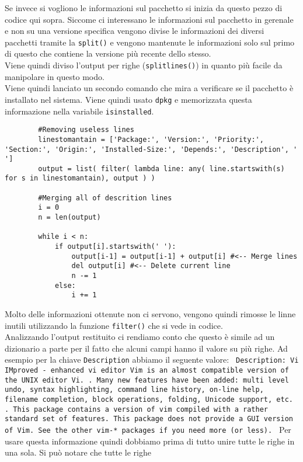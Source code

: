 \documentclass[11pt]{article}
\begin{document}
Se invece si vogliono le informazioni sul pacchetto si inizia da questo pezzo di codice qui sopra. Siccome ci interessano
le informazioni sul pacchetto in gerenale e non su una versione specifica vengono divise le informazioni dei diversi pacchetti
tramite la \texttt{split()} e vengono mantenute le informazioni solo sul primo di questo che contiene la versione
più recente dello stesso.\\
Viene quindi diviso l'output per righe (\texttt{splitlines()}) in quanto più facile da manipolare in questo modo.\\
Viene quindi lanciato un secondo comando che mira a verificare se il pacchetto è installato nel sistema. Viene quindi
usato \texttt{dpkg} e memorizzata questa informazione nella variabile \texttt{isinstalled}.
\begin{lstlisting}
        #Removing useless lines
        linestomantain = ['Package:', 'Version:', 'Priority:', 'Section:', 'Origin:', 'Installed-Size:', 'Depends:', 'Description', ' ']
        output = list( filter( lambda line: any( line.startswith(s) for s in linestomantain), output ) ) 

        #Merging all of descrition lines
        i = 0
        n = len(output)

        while i < n:
            if output[i].startswith(' '):
                output[i-1] = output[i-1] + output[i] #<-- Merge lines
                del output[i] #<-- Delete current line
                n -= 1
            else:
                i += 1
\end{lstlisting}
Molto delle informazioni ottenute non ci servono, vengono quindi rimosse le linne inutili utilizzando la funzione \texttt{filter()}
che si vede in codice.\\
Analizzando l'output restituito ci rendiamo conto che questo è simile ad un dizionario a parte per il fatto che alcuni campi
hanno il valore su più righe. Ad esempio per la chiave \texttt{Description} abbiamo il seguente valore:
\texttt{
Description: Vi IMproved - enhanced vi editor
 Vim is an almost compatible version of the UNIX editor Vi.
 .
 Many new features have been added: multi level undo, syntax
 highlighting, command line history, on-line help, filename
 completion, block operations, folding, Unicode support, etc.
 .
 This package contains a version of vim compiled with a rather
 standard set of features.  This package does not provide a GUI
 version of Vim.  See the other vim-* packages if you need more
 (or less).
}
Per usare questa informazione quindi dobbiamo prima di tutto unire tutte le righe in una sola. Si può notare che tutte le righe
\end{document}
